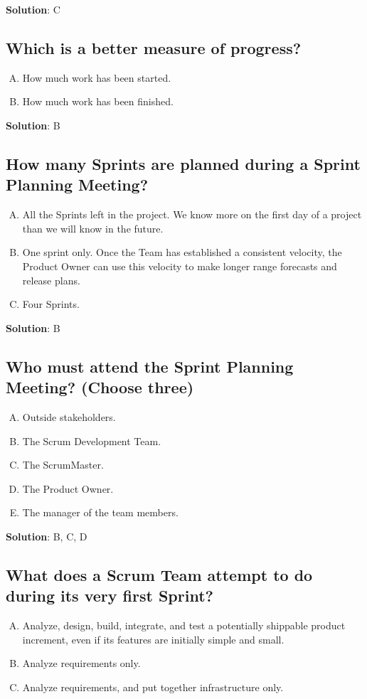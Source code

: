 \textbf{Solution}: C


\subsection{Which is a better measure of progress?}
\begin{enumerate}[A)]
  \item How much work has been started.
  \item How much work has been finished.
\end{enumerate}


\textbf{Solution}: B


\subsection{How many Sprints are planned during a Sprint Planning Meeting?}
\begin{enumerate}[A)]
  \item All the Sprints left in the project. We know more on the first day of a project than we will know in the future.
  \item One sprint only. Once the Team has established a consistent velocity, the Product Owner can use this velocity to make longer range forecasts and release plans.
  \item Four Sprints.
\end{enumerate}


\textbf{Solution}: B


\subsection{Who must attend the Sprint Planning Meeting? (Choose three)}


\begin{enumerate}[A)]
  \item Outside stakeholders.
  \item The Scrum Development Team.
  \item The ScrumMaster.
  \item The Product Owner.
  \item The manager of the team members.
\end{enumerate}


\textbf{Solution}: B, C, D


\subsection{What does a Scrum Team attempt to do during its very first Sprint?}
\begin{enumerate}[A)]
  \item Analyze, design, build, integrate, and test a potentially shippable product increment, even if its features are initially simple and small.
  \item Analyze requirements only.
  \item Analyze requirements, and put together infrastructure only.
\end{enumerate}


